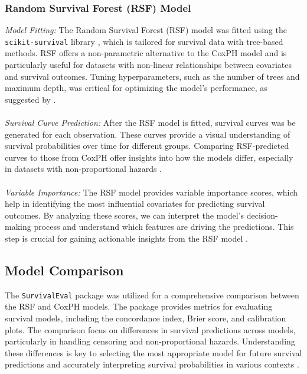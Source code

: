 \subsubsection*{Random Survival Forest (RSF) Model}
\noindent \textit{Model Fitting:} The Random Survival Forest (RSF) model was fitted using the \texttt{scikit-survival} library \parencite{sebastian_polsterl_scikit-survival_2023}, which is tailored for survival data with tree-based methods. RSF offers a non-parametric alternative to the CoxPH model and is particularly useful for datasets with non-linear relationships between covariates and survival outcomes. Tuning hyperparameters, such as the number of trees and maximum depth, was critical for optimizing the model's performance, as suggested by \parencite{ishwaran_random_2008}.
\\\\
\noindent \textit{Survival Curve Prediction:} After the RSF model is fitted, survival curves was be generated for each observation. These curves provide a visual understanding of survival probabilities over time for different groups. Comparing RSF-predicted curves to those from CoxPH offer insights into how the models differ, especially in datasets with non-proportional hazards \parencite{kurt_omurlu_comparisons_2009}.
\\\\
\noindent \textit{Variable Importance:} The RSF model provides variable importance scores, which help in identifying the most influential covariates for predicting survival outcomes. By analyzing these scores, we can interpret the model's decision-making process and understand which features are driving the predictions. This step is crucial for gaining actionable insights from the RSF model \parencite{ishwaran_random_2008}.

\subsection*{Model Comparison}
The \texttt{SurvivalEval} package \parencite{qi_survivaleval_2024} was utilized for a comprehensive comparison between the RSF and CoxPH models. The package provides metrics for evaluating survival models, including the concordance index, Brier score, and calibration plots. The comparison focus on differences in survival predictions across models, particularly in handling censoring and non-proportional hazards. Understanding these differences is key to selecting the most appropriate model for future survival predictions and accurately interpreting survival probabilities in various contexts \parencite{polce_guide_2023}.

